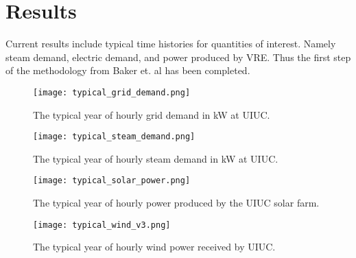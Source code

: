 \section{Results}

Current results include typical time histories for quantities of interest. Namely steam demand, electric demand, and power produced by VRE. Thus the first step of the methodology from Baker et. al has been completed.

\begin{figure}[H]
 	\centering
 	\label{fig:grid-demand}
 	\texttt{[image: typical\_grid\_demand.png]}
 	\caption{The typical year of hourly grid demand in kW at UIUC.}
\end{figure} 
\begin{figure}[H]
	\centering
	\label{fig:steam-demand}
	\texttt{[image: typical\_steam\_demand.png]}
	\caption{The typical year of hourly steam demand in kW at UIUC.}
\end{figure}
\begin{figure}[H]
	\centering
	\label{fig:solar-power}
	\texttt{[image: typical\_solar\_power.png]}
	\caption{The typical year of hourly power produced by the UIUC solar farm.}
\end{figure}
\begin{figure}[H]
	\centering
	\label{fig:wind-power}
	\texttt{[image: typical\_wind\_v3.png]}
	\caption{The typical year of hourly wind power received by UIUC.}
\end{figure}